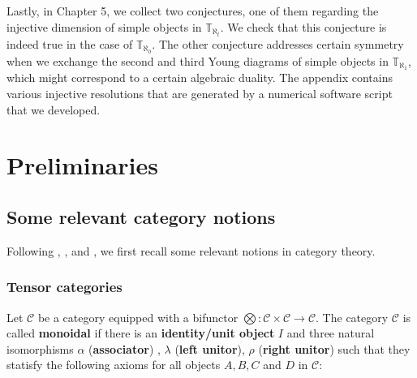 \documentclass[openany, a4paper]{amsbook}
\theoremstyle{definition}
\numberwithin{equation}{chapter}
\newcommand{\T}[1]{{\mathbb{T}}_{\aleph_{#1}}}
\begin{document}
Lastly, in Chapter 5, we collect two conjectures, one of them regarding the injective dimension of simple objects in $\T{t}$. We check that this conjecture is indeed true in the case of $\T{0}$. The other conjecture addresses certain symmetry when we exchange the second and third Young diagrams of simple objects in $\T{1}$, which might correspond to a certain algebraic duality. The appendix contains various injective resolutions that are generated by a numerical software script that we developed.

\chapter{Preliminaries}
\section{Some relevant category notions}
Following \cite{egno}, \cite{hungerford}, \cite{maclane} and \cite{popescu}, we first recall some relevant notions in category theory.

\subsection{Tensor categories}
    Let $\mathcal{C}$ be a category equipped with a bifunctor $\bigotimes: \mathcal{C} \times \mathcal{C} \to \mathcal{C}$. The category $\mathcal{C}$ is called \textbf{monoidal} if there is an \textbf{identity/unit object} $I$ and three natural isomorphisms $\alpha$ (\textbf{associator}) , $\lambda$ (\textbf{left unitor}), $\rho$ (\textbf{right unitor}) such that they statisfy the following axioms for all objects $A, B, C$ and $D$ in $\mathcal{C}$:
\end{document}
